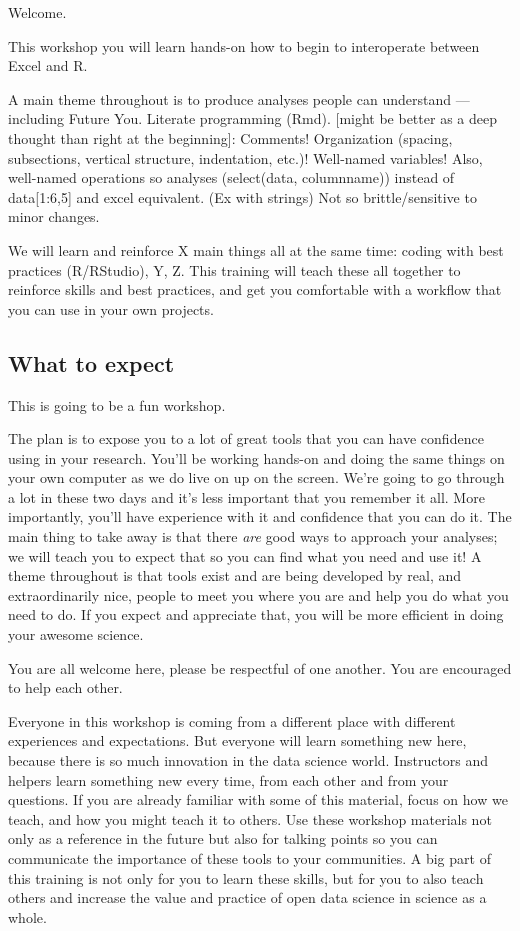 \documentclass[]{book}
\begin{document}
Welcome.

This workshop you will learn hands-on how to begin to interoperate between Excel and R.

A main theme throughout is to produce analyses people can understand --- including Future You. Literate programming (Rmd). {[}might be better as a deep thought than right at the beginning{]}: Comments! Organization (spacing, subsections, vertical structure, indentation, etc.)! Well-named variables! Also, well-named operations so analyses (select(data, columnname)) instead of data{[}1:6,5{]} and excel equivalent. (Ex with strings)
Not so brittle/sensitive to minor changes.

We will learn and reinforce X main things all at the same time: coding with best practices (R/RStudio), Y, Z. This training will teach these all together to reinforce skills and best practices, and get you comfortable with a workflow that you can use in your own projects.

\hypertarget{what-to-expect}{%
\subsection{What to expect}\label{what-to-expect}}

This is going to be a fun workshop.

The plan is to expose you to a lot of great tools that you can have confidence using in your research. You'll be working hands-on and doing the same things on your own computer as we do live on up on the screen. We're going to go through a lot in these two days and it's less important that you remember it all. More importantly, you'll have experience with it and confidence that you can do it. The main thing to take away is that there \emph{are} good ways to approach your analyses; we will teach you to expect that so you can find what you need and use it! A theme throughout is that tools exist and are being developed by real, and extraordinarily nice, people to meet you where you are and help you do what you need to do. If you expect and appreciate that, you will be more efficient in doing your awesome science.

You are all welcome here, please be respectful of one another. You are encouraged to help each other.

Everyone in this workshop is coming from a different place with different experiences and expectations. But everyone will learn something new here, because there is so much innovation in the data science world. Instructors and helpers learn something new every time, from each other and from your questions. If you are already familiar with some of this material, focus on how we teach, and how you might teach it to others. Use these workshop materials not only as a reference in the future but also for talking points so you can communicate the importance of these tools to your communities. A big part of this training is not only for you to learn these skills, but for you to also teach others and increase the value and practice of open data science in science as a whole.
\end{document}
